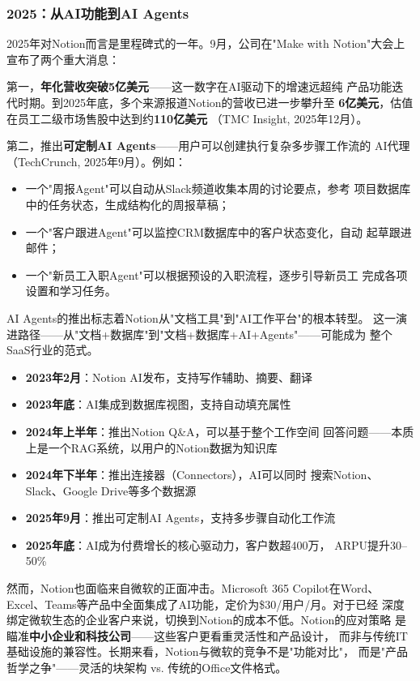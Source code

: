 \subsubsection{2025：从AI功能到AI Agents}
2025年对Notion而言是里程碑式的一年。9月，公司在"Make with Notion"大会上
宣布了两个重大消息：

第一，\textbf{年化营收突破5亿美元}——这一数字在AI驱动下的增速远超纯
产品功能迭代时期。到2025年底，多个来源报道Notion的营收已进一步攀升至
\textbf{6亿美元}，估值在员工二级市场售股中达到约\textbf{110亿美元}
（TMC Insight, 2025年12月）。

第二，推出\textbf{可定制AI Agents}——用户可以创建执行复杂多步骤工作流的
AI代理（TechCrunch, 2025年9月）。例如：
\begin{itemize}
  \item 一个"周报Agent"可以自动从Slack频道收集本周的讨论要点，参考
    项目数据库中的任务状态，生成结构化的周报草稿；
  \item 一个"客户跟进Agent"可以监控CRM数据库中的客户状态变化，自动
    起草跟进邮件；
  \item 一个"新员工入职Agent"可以根据预设的入职流程，逐步引导新员工
    完成各项设置和学习任务。
\end{itemize}

AI Agents的推出标志着Notion从"文档工具"到"AI工作平台"的根本转型。
这一演进路径——从"文档+数据库"到"文档+数据库+AI+Agents"——可能成为
整个SaaS行业的范式。

\begin{corebox}
\begin{itemize}
  \item \textbf{2023年2月}：Notion AI发布，支持写作辅助、摘要、翻译
  \item \textbf{2023年底}：AI集成到数据库视图，支持自动填充属性
  \item \textbf{2024年上半年}：推出Notion Q\&A，可以基于整个工作空间
    回答问题——本质上是一个RAG系统，以用户的Notion数据为知识库
  \item \textbf{2024年下半年}：推出连接器（Connectors），AI可以同时
    搜索Notion、Slack、Google Drive等多个数据源
  \item \textbf{2025年9月}：推出可定制AI Agents，支持多步骤自动化工作流
  \item \textbf{2025年底}：AI成为付费增长的核心驱动力，客户数超400万，
    ARPU提升30--50\%
\end{itemize}
\end{corebox}

然而，Notion也面临来自微软的正面冲击。Microsoft 365 Copilot在Word、
Excel、Teams等产品中全面集成了AI功能，定价为\$30/用户/月。对于已经
深度绑定微软生态的企业客户来说，切换到Notion的成本不低。Notion的应对策略
是瞄准\textbf{中小企业和科技公司}——这些客户更看重灵活性和产品设计，
而非与传统IT基础设施的兼容性。长期来看，Notion与微软的竞争不是"功能对比"，
而是"产品哲学之争"——灵活的块架构 vs. 传统的Office文件格式。


